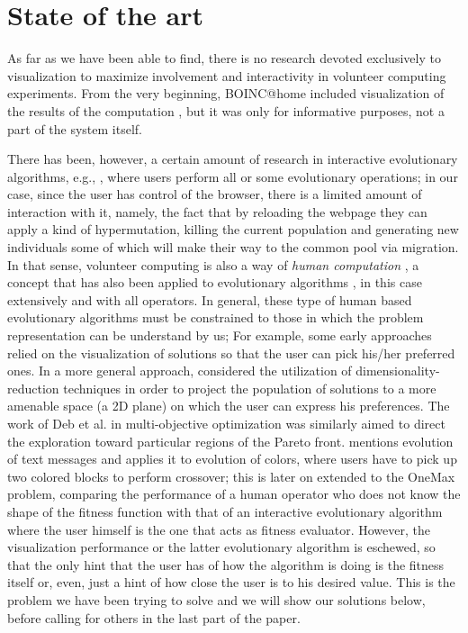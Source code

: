 \documentclass{sig-alternate}
\begin{document}
\section{State of the art}
\label{sec:soa}

As far as we have been able to find, there is no research devoted
exclusively to visualization to maximize involvement and interactivity
in volunteer computing experiments. From the very beginning,
BOINC@home included visualization of the results of the computation
\cite{anderson2006designing}, but it was only for informative
purposes, not a part of the system itself. 

There has been, however, a certain amount of research in interactive
evolutionary algorithms, e.g., \cite{takagi01interactive,parmee:human-centric2003,parmee08user-centric,badillo13usercentric}, 
where users perform all or some evolutionary
operations; in our case, since the
user has control of the browser, there is a limited amount of
interaction with it, namely, the fact that by reloading the webpage they
can apply a kind of hypermutation, killing the current population and
generating new individuals some of which will make their way to the
common pool via migration. In that sense, volunteer computing is also
a way of {\em human computation} \cite{quinn2011human}, a concept that
has also been applied to evolutionary algorithms \cite{972056, Nickerson2013}, in
this case extensively and with all operators. In general, these type
of human based evolutionary algorithms must be constrained to those in
which the problem representation can be understand by us; 
For example, some early approaches 
\cite{Daw86} relied on the visualization of solutions so that the user can 
pick his/her preferred ones. In a more general approach, \cite{takagi-jcis2000} 
considered the utilization of dimensionality-reduction techniques in order
to project the population of solutions to a more amenable space (a 2D plane)
on which the user can express his preferences. The work of Deb et al. in
multi-objective optimization \cite{DC07,DK07} was similarly aimed to direct 
the exploration toward particular regions of the Pareto front.
\cite{cheng2004interactive} mentions evolution of text messages and
applies it to evolution of colors, where users have to pick up two
colored blocks to perform crossover; this is later on extended to the
OneMax problem, comparing the performance of a human operator who does
not know the shape of the fitness function with that of an interactive
evolutionary algorithm where the user himself is the one that acts as
fitness evaluator.
However, the visualization performance or the latter evolutionary algorithm is
eschewed, so that the only hint
that the user has of how the algorithm is doing is the fitness itself
or, even, just a hint of how close the user is to his desired
value. This is the problem we have been trying to solve and we will
show our solutions below, before calling for others in the last part
of the paper. 
\end{document}
